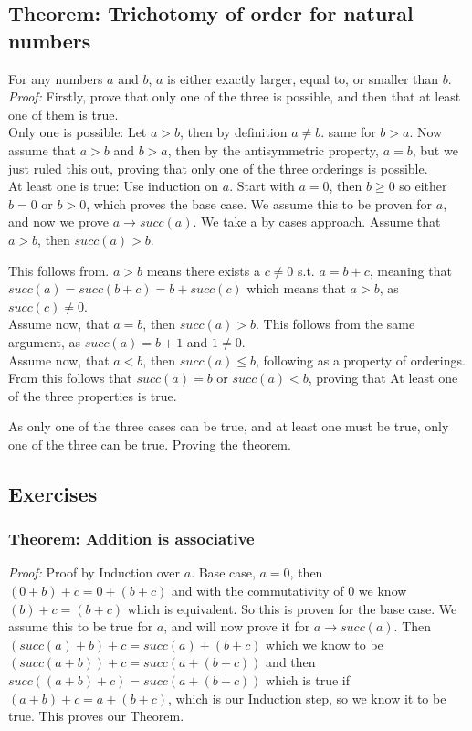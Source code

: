 \subsection{Theorem: Trichotomy of order for natural numbers}
For any numbers $a$ and $b$, $a$ is either exactly larger, equal to, or smaller than $b$.\\
\textit{Proof:} Firstly, prove that only one of the three is possible, and then that at least one of them is true.\\
Only one is possible: Let $a > b$, then by definition $a \neq b$. same for $b > a$. Now assume that $a>b$ and $b >a$, then by the antisymmetric property, $a = b$, but we just ruled this out, proving that only one of the three orderings is possible.\\
At least one is true: Use induction on $a$. Start with $a = 0$, then $b \geqslant 0$ so either $ b = 0$ or $b > 0$, which proves the base case. We assume this to be proven for $a$, and now we prove $a\rightarrow succ(a)$. We take a by cases approach. Assume that $a > b$, then $succ(a) > b$.

This follows from. $a > b$ means there exists a $c \neq 0$ s.t. $a = b + c$, meaning that $succ(a) = succ(b + c) = b + succ(c)$ which means that $a > b$, as $succ(c) \neq 0$.\\
Assume now, that $a = b$, then $succ(a) > b$. This follows from the same argument, as $succ(a) = b + 1$ and $1 \neq 0$.\\
Assume now, that $a < b$, then $succ(a) \leqslant b$, following as a property of orderings. From this follows that $succ(a) = b$ or $succ(a) < b$, proving that At least one of the three properties is true.

As only one of the three cases can be true, and at least one must be true, only one of the three can be true. Proving the theorem.

\subsection{Exercises}

\subsubsection*{Theorem: Addition is associative}
\textit{Proof:} Proof by Induction over $a$. Base case, $a = 0$, then $(0 + b) + c = 0 + (b + c)$ and with the commutativity of 0 we know $(b) + c = (b + c)$ which is equivalent. So this is proven for the base case. We assume this to be true for $a$, and will now prove it for $a\rightarrow succ(a)$. Then $(succ(a) + b) + c = succ(a) + (b + c)$ which we know to be $(succ(a + b)) + c = succ(a + (b + c))$ and then $succ((a + b) + c) = succ(a + (b+c))$ which is true if $(a +b) +c = a + (b+c)$, which is our Induction step, so we know it to be true. This proves our Theorem.

